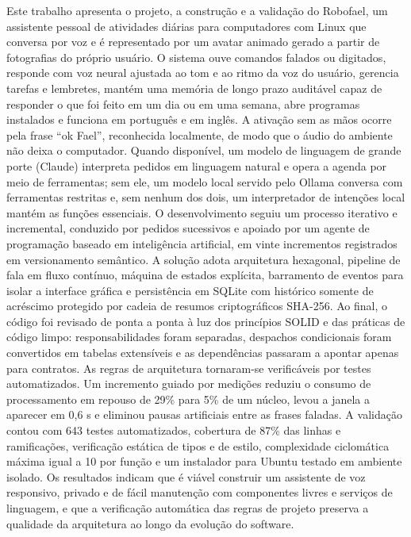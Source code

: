 \noindent
Este trabalho apresenta o projeto, a construção e a validação do Robofael, um assistente pessoal de
atividades diárias para computadores com Linux que conversa por voz e é representado por um avatar
animado gerado a partir de fotografias do próprio usuário. O sistema ouve comandos falados ou
digitados, responde com voz neural ajustada ao tom e ao ritmo da voz do usuário, gerencia tarefas e
lembretes, mantém uma memória de longo prazo auditável capaz de responder o que foi feito em um dia ou
em uma semana, abre programas instalados e funciona em português e em inglês. A ativação sem as mãos
ocorre pela frase “ok Fael”, reconhecida localmente, de modo que o áudio do ambiente não deixa o
computador. Quando disponível, um modelo de linguagem de grande porte (Claude) interpreta pedidos em
linguagem natural e opera a agenda por meio de ferramentas; sem ele, um modelo local servido pelo Ollama
conversa com ferramentas restritas e, sem nenhum dos dois, um interpretador de intenções local mantém as
funções essenciais. O desenvolvimento seguiu um processo iterativo e incremental,
conduzido por pedidos sucessivos e apoiado por um agente de programação baseado em inteligência
artificial, em vinte incrementos registrados em versionamento semântico. A solução adota arquitetura
hexagonal, pipeline de fala em fluxo contínuo, máquina de estados explícita, barramento de eventos
para isolar a interface gráfica e persistência em SQLite com histórico somente de acréscimo protegido
por cadeia de resumos criptográficos SHA-256. Ao final, o código foi revisado de ponta a ponta à luz
dos princípios SOLID e das práticas de código limpo: responsabilidades foram separadas, despachos
condicionais foram convertidos em tabelas extensíveis e as dependências passaram a apontar apenas
para contratos. As regras de arquitetura tornaram-se verificáveis por testes automatizados. Um
incremento guiado por medições reduziu o consumo de processamento em repouso de 29\% para 5\% de um
núcleo, levou a janela a aparecer em 0,6 s e eliminou pausas artificiais entre as frases faladas. A
validação contou com 643 testes automatizados, cobertura de 87\% das linhas e ramificações,
verificação estática de tipos e de estilo, complexidade ciclomática máxima igual a 10 por função e um
instalador para Ubuntu testado em ambiente isolado. Os resultados indicam que é viável construir um
assistente de voz responsivo, privado e de fácil manutenção com componentes livres e serviços de
linguagem, e que a verificação automática das regras de projeto preserva a qualidade da arquitetura
ao longo da evolução do software.

